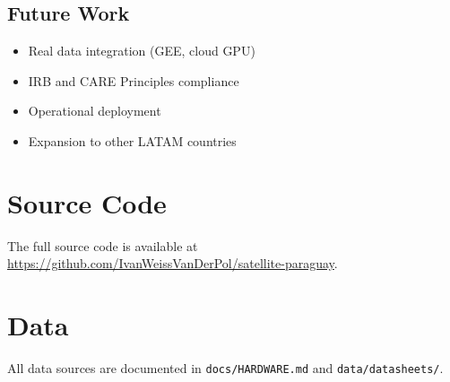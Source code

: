 \documentclass[12pt,a4paper,oneside]{book}
\begin{document}
\section{Future Work}

\begin{itemize}
\item Real data integration (GEE, cloud GPU)
\item IRB and CARE Principles compliance
\item Operational deployment
\item Expansion to other LATAM countries
\end{itemize}

\appendix

\chapter{Source Code}
\label{app:code}

The full source code is available at
\url{https://github.com/IvanWeissVanDerPol/satellite-paraguay}.

\chapter{Data}
\label{app:data}

All data sources are documented in
\texttt{docs/HARDWARE.md} and \texttt{data/datasheets/}.



\end{document}
